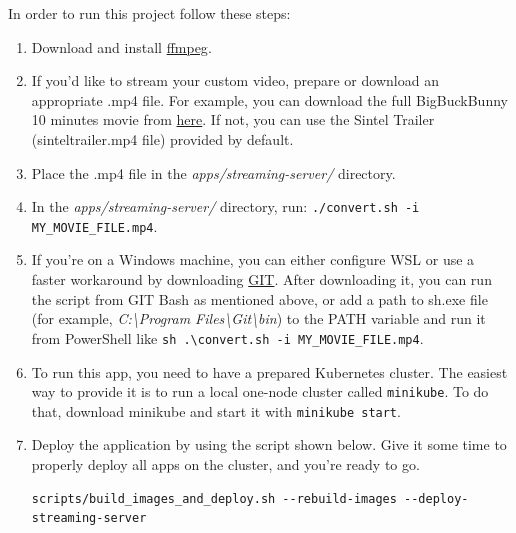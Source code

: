 \documentclass{article}
\begin{document}
In order to run this project follow these steps:
\begin{enumerate}
    \item Download and install \href{https://ffmpeg.org}{ffmpeg}.
    
    \item If you'd like to stream your custom video, prepare or download an appropriate .mp4 file. For example, you can download the full BigBuckBunny 10 minutes movie from \href{http://commondatastorage.googleapis.com/gtv-videos-bucket/sample/BigBuckBunny.mp4}{here}. If not, you can use the Sintel Trailer (sinteltrailer.mp4 file) provided by default.
    
    \item Place the .mp4 file in the \emph{apps/streaming-server/} directory.
    
    \item In the \emph{apps/streaming-server/} directory, run: \texttt{./convert.sh -i MY\_MOVIE\_FILE.mp4}.
    
    \item If you're on a Windows machine, you can either configure WSL or use a faster workaround by downloading \href{https://git-scm.com/downloads}{GIT}. After downloading it, you can run the script from GIT Bash as mentioned above, or add a path to sh.exe file (for example, \emph{C:\textbackslash Program Files\textbackslash Git\textbackslash bin}) to the PATH variable and run it from PowerShell like \texttt{sh .\textbackslash convert.sh -i MY\_MOVIE\_FILE.mp4}.
    
    \item To run this app, you need to have a prepared Kubernetes cluster. The easiest way to provide it is to run a local one-node cluster called \texttt{minikube}. To do that, download minikube and start it with \texttt{minikube start}.
    
    \item Deploy the application by using the script shown below. Give it some time to properly deploy all apps on the cluster, and you're ready to go.

    \begin{verbatim}scripts/build_images_and_deploy.sh --rebuild-images --deploy-streaming-server\end{verbatim}
    

\end{enumerate}
\end{document}
